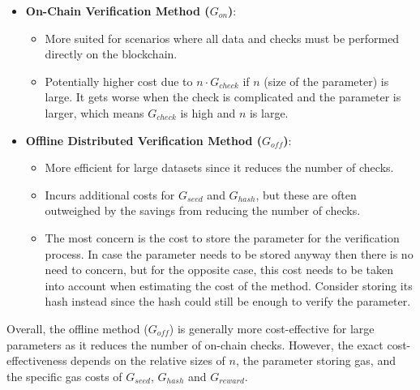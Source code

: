 \documentclass[runningheads]{llncs}
\begin{document}
\begin{itemize}
    \item \textbf{On-Chain Verification Method (\( G_{on} \))}:
    \begin{itemize}
        \item More suited for scenarios where all data and checks must be performed directly on the blockchain.
        \item Potentially higher cost due to \( n \cdot G_{check} \) if \( n \) (size of the parameter) is large. It gets worse when the check is complicated and the parameter is larger, which means \( G_{check} \) is high and \( n \) is large.
    \end{itemize}
    
    \item \textbf{Offline Distributed Verification Method (\( G_{off} \))}:
    \begin{itemize}
        \item More efficient for large datasets since it reduces the number of checks. %
        \item Incurs additional costs for \( G_{seed} \) and \( G_{hash} \), but these are often outweighed by the savings from reducing the number of checks.
        \item The most concern is the cost to store the parameter for the verification process. In case the parameter needs to be stored anyway then there is no need to concern, but for the opposite case, this cost needs to be taken into account when estimating the cost of the method. Consider storing its hash instead since the hash could still be enough to verify the parameter. %
    \end{itemize}
\end{itemize}

Overall, the offline method (\( G_{off} \)) is generally more cost-effective for large parameters as it reduces the number of on-chain checks. However, the exact cost-effectiveness depends on the relative sizes of \( n \), the parameter storing gas, and the specific gas costs of \( G_{seed} \), \( G_{hash} \) and \( G_{reward} \).
\end{document}

